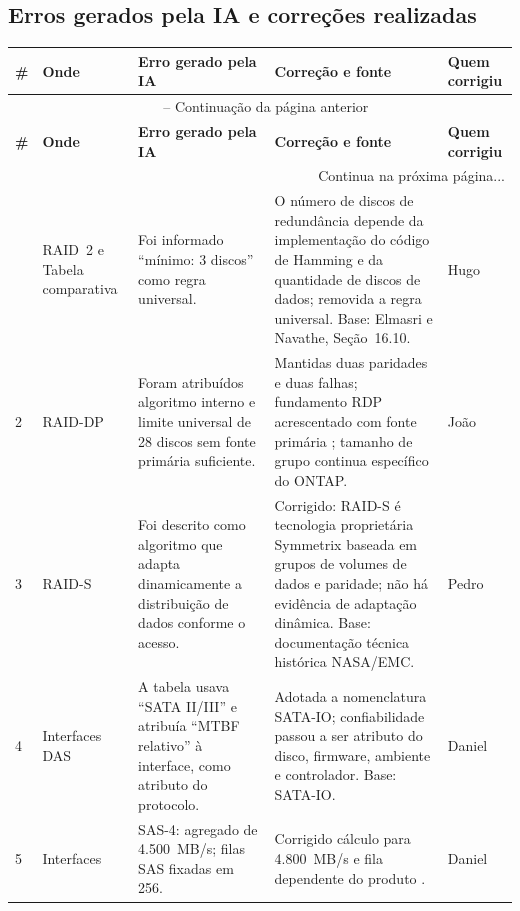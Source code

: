 \documentclass[titlepage]{article}
\begin{document}
\subsection{Erros gerados pela IA e correções realizadas}

\begingroup
\footnotesize
\renewcommand{\arraystretch}{1.5}
\begin{longtable}{|p{}|p{}|p{}|p{}|p{}|}
\hline
\textbf{\#} & \textbf{Onde} & \textbf{Erro gerado pela IA} & \textbf{Correção e fonte} & \textbf{Quem corrigiu} \\
\hline
\endfirsthead
\multicolumn{5}{c}{{\tablename\ \thetable{} -- Continuação da página anterior}} \\
\hline
\textbf{\#} & \textbf{Onde} & \textbf{Erro gerado pela IA} & \textbf{Correção e fonte} & \textbf{Quem corrigiu} \\
\hline
\endhead
\hline \multicolumn{5}{r}{{Continua na próxima página...}} \\
\endfoot
\hline
\endlastfoot
1 & RAID~2 e Tabela comparativa & Foi informado ``mínimo: 3 discos'' como regra universal. & O número de discos de redundância depende da implementação do código de Hamming e da quantidade de discos de dados; removida a regra universal. Base: Elmasri e Navathe, Seção~16.10. & Hugo \\
\hline
2 & RAID-DP & Foram atribuídos algoritmo interno e limite universal de 28 discos sem fonte primária suficiente. & Mantidas duas paridades e duas falhas; fundamento RDP acrescentado com fonte primária \cite{corbett2004}; tamanho de grupo continua específico do ONTAP. & João \\
\hline
3 & RAID-S & Foi descrito como algoritmo que adapta dinamicamente a distribuição de dados conforme o acesso. & Corrigido: RAID-S é tecnologia proprietária Symmetrix baseada em grupos de volumes de dados e paridade; não há evidência de adaptação dinâmica. Base: documentação técnica histórica NASA/EMC. & Pedro \\
\hline
4 & Interfaces DAS & A tabela usava ``SATA II/III'' e atribuía ``MTBF relativo'' à interface, como atributo do protocolo. & Adotada a nomenclatura SATA-IO; confiabilidade passou a ser atributo do disco, firmware, ambiente e controlador. Base: SATA-IO. & Daniel \\
\hline
5 & Interfaces & SAS-4: agregado de 4.500~MB/s; filas SAS fixadas em 256. & Corrigido cálculo para 4.800~MB/s e fila dependente do produto \cite{microchip_sas4,seagate_sas}. & Daniel \\

\end{longtable}
\end{document}
